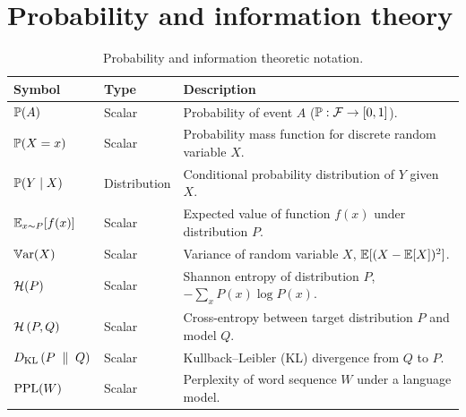 \documentclass[../main.tex]{subfiles}
\begin{document}
\section*{Probability and information theory}
\begin{table}[htbp]
\centering
\small
\renewcommand{\arraystretch}{1.3}
\begin{tabularx}{\textwidth}{llX}
\toprule
\textbf{Symbol} & \textbf{Type} & \textbf{Description} \\
\midrule
$\mathbb{P}(A)$ & Scalar & Probability of event $A$ ($\mathbb{P}: \mathcal{F} \to [0, 1]$). \\
$\mathbb{P}(X = x)$ & Scalar & Probability mass function for discrete random variable $X$. \\
$\mathbb{P}(Y \mid X)$ & Distribution & Conditional probability distribution of $Y$ given $X$. \\
$\operatorname*{\mathbb{E}}_{x \sim P}[f(x)]$ & Scalar & Expected value of function $f(x)$ under distribution $P$. \\
$\operatorname{\mathbb{V}\mathrm{ar}}(X)$ & Scalar & Variance of random variable $X$, $\operatorname*{\mathbb{E}}[(X - \operatorname*{\mathbb{E}}[X])^2]$. \\
$\mathcal{H}(P)$ & Scalar & Shannon entropy of distribution $P$, $-\sum_x P(x) \log P(x)$. \\
$\mathcal{H}\left(P, Q\right)$ & Scalar & Cross-entropy between target distribution $P$ and model $Q$. \\
$D_{\mathrm{KL}}\left(P \;\parallel\; Q\right)$ & Scalar & Kullback--Leibler (KL) divergence from $Q$ to $P$. \\
$\mathrm{PPL}(W)$ & Scalar & Perplexity of word sequence $W$ under a language model. \\
\bottomrule
\end{tabularx}
\caption{Probability and information theoretic notation.}
\label{tab:notation_prob}
\end{table}
\end{document}

